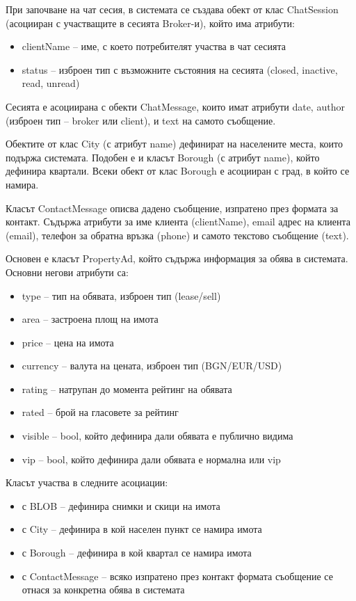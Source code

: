 \documentclass[a4paper]{article}
\begin{document}
При започване на чат сесия, в системата се създава обект от клас ChatSession (асоцииран с участващите в сесията Broker-и), който има атрибути:
\begin{itemize}
\item clientName -- име, с което потребителят участва в чат сесията
\item status -- изброен тип с възможните състояния на сесията (closed, inactive, read, unread)
\end{itemize}
Сесията е асоциирана с обекти ChatMessage, които имат атрибути date, author (изброен тип -- broker или client), и text на самото съобщение.

Обектите от клас City (с атрибут name) дефинират на населените места, които подържа системата. Подобен е и класът Borough (с атрибут name), който дефинира квартали. Всеки обект от клас Borough е асоцииран с град, в който се намира.

Класът ContactMessage описва дадено съобщение, изпратено през формата за контакт. Съдържа атрибути за име клиента (clientName), email адрес на клиента (email), телефон за обратна връзка (phone) и самото текстово съобщение (text).

Основен е класът PropertyAd, който съдържа информация за обява в системата. Основни негови атрибути са:
\begin{itemize}
\item type -- тип на обявата, изброен тип (lease/sell)
\item area -- застроена площ на имота
\item price -- цена на имота
\item currency -- валута на цената, изброен тип (BGN/EUR/USD)
\item rating -- натрупан до момента рейтинг на обявата
\item rated -- брой на гласовете за рейтинг
\item visible -- bool, който дефинира дали обявата е публично видима
\item vip -- bool, който дефинира дали обявата е нормална или vip
\end{itemize}
Класът участва в следните асоциации:
\begin{itemize}
\item с BLOB -- дефинира снимки и скици на имота
\item с City -- дефинира в кой населен пункт се намира имота
\item с Borough -- дефинира в кой квартал се намира имота
\item с ContactMessage -- всяко изпратено през контакт формата съобщение се отнася за конкретна обява в системата
\end{itemize}
\end{document}
